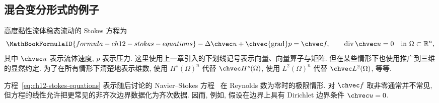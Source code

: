 \subsection{混合变分形式的例子}
\label{sec:ch12-examples-mixed-formulations}
\setcounter{thmcount}{0}
\setcounter{equation}{0}

高度黏性流体稳态流动的 Stokes 方程为
\begin{equation}
\MathBookFormulaID{formula-ch12-stokes-equations}
\label{eq:ch12-stokes-equations}
-\Delta\chvec u+\chvec{\operatorname{grad}}p=\chvec f,
\qquad
\operatorname{div}\chvec u=0
\quad\text{in }\Omega\subset\mathbb R^n,
\end{equation}
其中 $\chvec u$ 表示流体速度, $p$ 表示压力. 这里使用上一章引入的下划线记号表示向量、向量算子与矩阵. 但在某些情形下也使用推广到三维的显然约定. 为了在所有情形下清楚地表示维数, 使用 $H^s(\Omega)^n$ 代替 $\chvec H^s(\Omega)$, 使用 $L^2(\Omega)^n$ 代替 $\chvec L^2(\Omega)$, 等等.

方程~\eqref{eq:ch12-stokes-equations} 表示随后讨论的 Navier--Stokes 方程~ 在 Reynolds 数为零时的极限情形. 对 $\chvec f$ 取非零通常并不常见, 但方程的线性允许把更常见的非齐次边界数据化为齐次数据. 因而, 例如, 假设在边界上具有 Dirichlet 边界条件 $\chvec u=0$.


